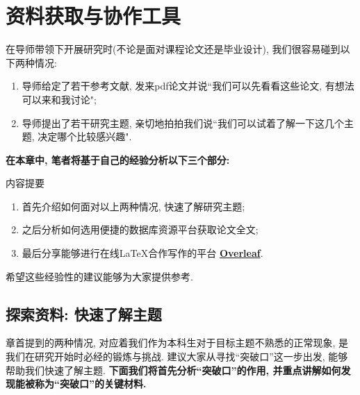 \documentclass{booki}
\begin{document}
\chapter{资料获取与协作工具}
在导师带领下开展研究时(不论是面对课程论文还是毕业设计), 我们很容易碰到以下两种情况:
\begin{enumerate}
    \item 导师给定了若干参考文献, 发来pdf论文并说``我们可以先看看这些论文, 有想法可以来和我讨论";
    \item 导师提出了若干研究主题, 亲切地拍拍我们说``我们可以试着了解一下这几个主题, 决定哪个比较感兴趣".
\end{enumerate}

\textbf{在本章中, 笔者将基于自己的经验分析以下三个部分:}
\begin{titledBox}{内容提要}
\begin{enumerate}
    \item 首先介绍如何面对以上两种情况, 快速了解研究主题;
    \item 之后分析如何{选用便捷的}数据库资源平台获取论文全文;
    \item 最后分享能够进行在线\LaTeX 合作写作的平台 \textbf{\href{https://www.overleaf.com/}{Overleaf}}.
\end{enumerate}
\end{titledBox}
希望这些经验性的建议能够为大家提供参考.

\section{探索资料: 快速了解主题}
章首提到的两种情况, 对应着我们作为本科生对于目标主题不熟悉的正常现象, 是我们在研究开始时必经的锻炼与挑战. 建议大家从寻找``突破口''这一步出发, 能够帮助我们快速了解主题. {\textbf{下面我们将首先分析``突破口''的作用, 并重点讲解如何发现能被称为``突破口''的关键材料.}}
\end{document}
